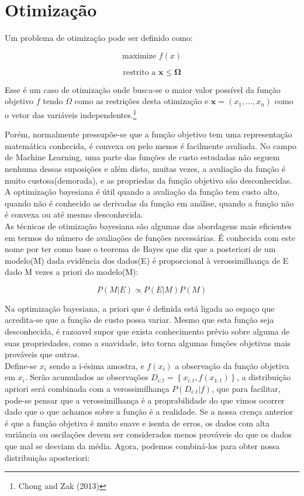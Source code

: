 \documentclass[
	12pt,				%
	a4paper,		%
	oneside,    %
	chapter=TITLE,		   %
	section=TITLE,		   %
	subsection=TITLE,	   %
	subsubsection=TITLE, %
	english,			%
	french,				%
	spanish,			%
	brazil,				%
]{abntex2}
\begin{document}
\hypertarget{otimizauxe7uxe3o}{%
\section{Otimização}\label{otimizauxe7uxe3o}}

Um problema de otimização pode ser definido como:

\[
\mbox{maximize } f(x)
\]

\[
\mbox{restrito a } \boldsymbol{x} \leq \boldsymbol{\Omega}
\]

Esse é um caso de otimização onde busca-se o maior valor possível da
função objetivo \(f\) tendo \(\Omega\) como as restrições desta
otimização e \(\boldsymbol{x} = (x_1,...,x_n)\) como o vetor das
variáveis independentes.\footnote{Chong and Zak (2013)}

Porém, normalmente pressupõe-se que a função objetivo tem uma
representação matemática conhecida, é convexa ou pelo menos é facilmente
avaliada. No campo de Machine Learning, uma parte das funções de custo
estudadas não seguem nenhuma dessas suposições e além disto, muitas
vezes, a avaliação da função é muito custosa(demorada), e as propriedas
da função objetivo são desconhecidas.\\

A optimização bayesiana é útil quando a avaliação da função tem custo
alto, quando não é conhecido as derivadas da função em análise, quando a
função não é convexa ou até mesmo desconhecida.\\

As técnicas de otimização bayesiana são algumas das abordagens mais
eficientes em termos do número de avaliações de funções necessárias. É
conhecida com este nome por ter como base o teorema de Bayes que diz que
a posteriori de um modelo(M) dada evidência dos dados(E) é proporcional
à verossimilhança de E dado M vezes a priori do modelo(M):

\[
P(M|E) \propto P(E|M)P(M)
\]

Na optimização bayesiana, a priori que é definida está ligada ao espaço
que acredita-se que a função de custo possa variar. Mesmo que esta
função seja desconhecida, é razoavel supor que exista conhecimento
prévio sobre alguma de suas propriedades, como a suavidade, isto torna
algumas funções objetivas mais prováveis que outras.\\

Define-se \(x_i\) sendo a i-ésima amostra, e \(f(x_i)\) a observação da
função objetiva em \(x_i\). Serão acumulados as observações
\(D_{i:t}=\left\{ x_{i:t},f(x_{1:t}) \right\}\), a distribuição apriori
será combinada com a verossimilhança \(P(D_{i:t}|f)\), que para
facilitar, pode-se pensar que a verossimilhança é a proprabilidade do
que vimos ocorrer dado que o que achamos sobre a função é a realidade.
Se a nossa crença anterior é que a função objetiva é muito suave e
isenta de erros, os dados com alta variância ou oscilações devem ser
considerados menos prováveis do que os dados que mal se desviam da
média. Agora, podemos combiná-los para obter nossa distribuição
aposteriori:
\end{document}
